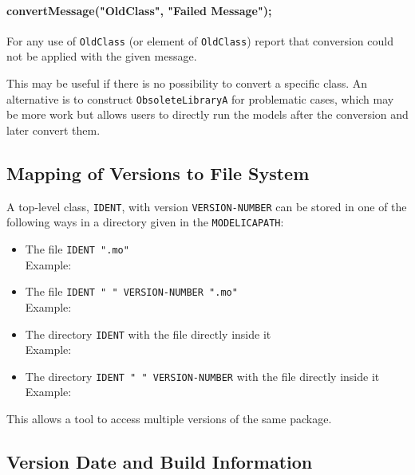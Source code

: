 \paragraph*{convertMessage("OldClass", "Failed Message");}\label{convertmessageoldclass-failed-message}

For any use of \lstinline!OldClass! (or element of \lstinline!OldClass!) report that conversion
could not be applied with the given message.

\begin{nonnormative}
This may be useful if there is no possibility to convert a specific class.  An alternative is to construct \lstinline!ObsoleteLibraryA! for problematic
cases, which may be more work but allows users to directly run the models after the conversion and later convert them.
\end{nonnormative}

\subsection{Mapping of Versions to File System}\label{mapping-of-versions-to-file-system}

A top-level class, \lstinline!IDENT!, with version \lstinline!VERSION-NUMBER! can be stored in
one of the following ways in a directory given in the \lstinline!MODELICAPATH!:
\begin{itemize}
\item
  The file \lstinline!IDENT ".mo"!\\
  Example: 
\item
  The file \lstinline!IDENT " " VERSION-NUMBER ".mo"!\\
  Example: 
\item
  The directory \lstinline!IDENT! with the file  directly inside it\\
  Example: 
\item
  The directory \lstinline!IDENT " " VERSION-NUMBER! with the file  directly inside it\\
  Example: 
\end{itemize}

This allows a tool to access multiple versions of the same package.

\subsection{Version Date and Build Information}\label{version-date-and-build-information}

